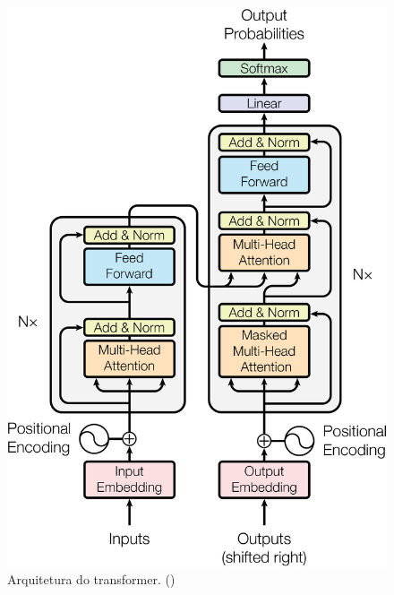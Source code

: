 \begin{figure}
  \begin{minipage}[b]{0.6\textwidth}
    \includegraphics[scale=0.5]{images/ModalNet-21}
    \caption{Arquitetura do transformer. ()}
    \label{fig:transformer-arch}
  \end{minipage}
  \begin{minipage}[b]{0.5\textwidth}
    \centering

\end{minipage}
\end{figure}
